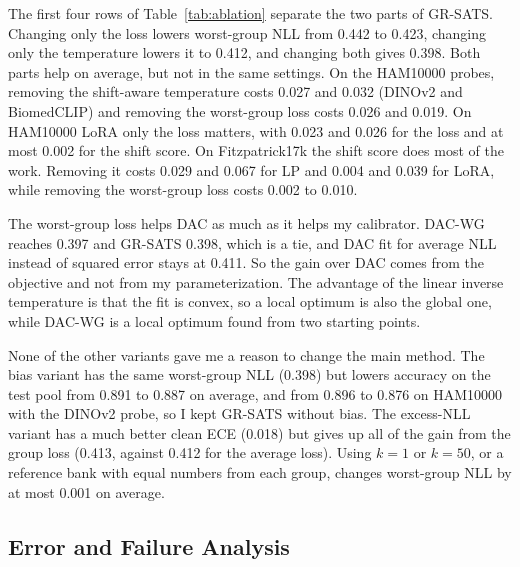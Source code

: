\documentclass[sigconf,nonacm]{acmart}
\begin{document}
The first four rows of Table~\ref{tab:ablation} separate the two parts of GR-SATS. Changing only the loss lowers worst-group NLL from 0.442 to 0.423, changing only the temperature lowers it to 0.412, and changing both gives 0.398. Both parts help on average, but not in the same settings. On the HAM10000 probes, removing the shift-aware temperature costs 0.027 and 0.032 (DINOv2 and BiomedCLIP) and removing the worst-group loss costs 0.026 and 0.019. On HAM10000 LoRA only the loss matters, with 0.023 and 0.026 for the loss and at most 0.002 for the shift score. On Fitzpatrick17k the shift score does most of the work. Removing it costs 0.029 and 0.067 for LP and 0.004 and 0.039 for LoRA, while removing the worst-group loss costs 0.002 to 0.010.

The worst-group loss helps DAC as much as it helps my calibrator. DAC-WG reaches 0.397 and GR-SATS 0.398, which is a tie, and DAC fit for average NLL instead of squared error stays at 0.411. So the gain over DAC comes from the objective and not from my parameterization. The advantage of the linear inverse temperature is that the fit is convex, so a local optimum is also the global one, while DAC-WG is a local optimum found from two starting points.

None of the other variants gave me a reason to change the main method. The bias variant has the same worst-group NLL (0.398) but lowers accuracy on the test pool from 0.891 to 0.887 on average, and from 0.896 to 0.876 on HAM10000 with the DINOv2 probe, so I kept GR-SATS without bias. The excess-NLL variant has a much better clean ECE (0.018) but gives up all of the gain from the group loss (0.413, against 0.412 for the average loss). Using $k = 1$ or $k = 50$, or a reference bank with equal numbers from each group, changes worst-group NLL by at most 0.001 on average.

\subsection{Error and Failure Analysis}
\label{sec:failure}

\begin{table}[t]
  \caption{Worst-group NLL at severities 3 to 5 by held-out family, averaged over the four settings of each dataset. TS-C is TS with corruptions and GR is GR-SATS. $^*$The task-specific family is not in the main pool for Fitzpatrick17k.}
  \label{tab:families}
  \scriptsize
  \setlength{\tabcolsep}{2.5pt}
  \centering
  
\end{table}
\end{document}
